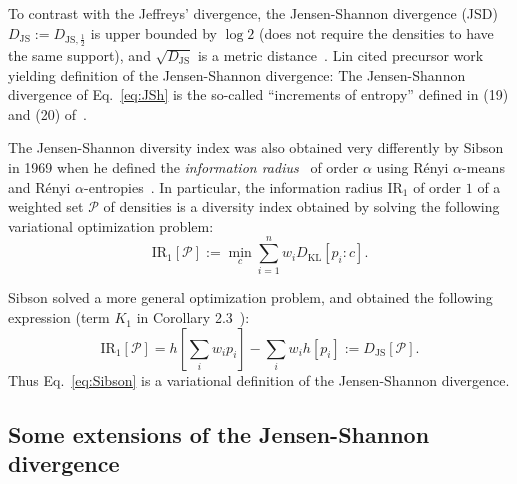 \documentclass[11pt]{article}
\def\KL{\mathrm{KL}}
\def\calP{\mathcal{P}}
\def\KL{\mathrm{KL}}
\def\JS{\mathrm{JS}}
\def\IR{\mathrm{IR}}
\begin{document}
To contrast with the Jeffreys' divergence, the Jensen-Shannon divergence (JSD) $D_\JS:=D_{\JS,\frac{1}{2}}$ is upper bounded by $\log 2$ (does not require the densities to have the same support), and $\sqrt{D_\JS}$ is 
a metric distance~\cite{JSmetric-2003,JSmetric-2004}.
Lin cited precursor work~\cite{WongYOU-1985,JW-1988} yielding definition of the Jensen-Shannon divergence:
The Jensen-Shannon divergence  of Eq.~\ref{eq:JSh} is the so-called ``increments of entropy'' defined in (19) and (20) of~\cite{WongYOU-1985}.

The Jensen-Shannon diversity index was also obtained very differently by Sibson in 1969 when he defined the {\em information radius}~\cite{Sibson-1969} of order $\alpha$ using R\'enyi $\alpha$-means and R\'enyi $\alpha$-entropies~\cite{Renyi-1961}.
In particular, the information radius $\IR_1$ of order $1$ of a weighted set $\calP$ of densities is a diversity index obtained by solving the following variational optimization problem:
\begin{equation}
\IR_{1}[\calP]:=\min_{c} \sum_{i=1}^n w_i D_\KL[p_i:c].  \label{eq:Sibson}
\end{equation}

Sibson solved a more general optimization problem, and obtained the following expression (term $K_1$ in Corollary 2.3~\cite{Sibson-1969}):
$$
\IR_{1}[\calP]=  h\left[\sum_i w_ip_i\right]-\sum_i w_i h[p_i]:=D_\JS[\calP].
$$
Thus Eq.~\ref{eq:Sibson} is a variational definition of the Jensen-Shannon divergence.

\subsection{Some extensions of the Jensen-Shannon divergence}
\end{document}
